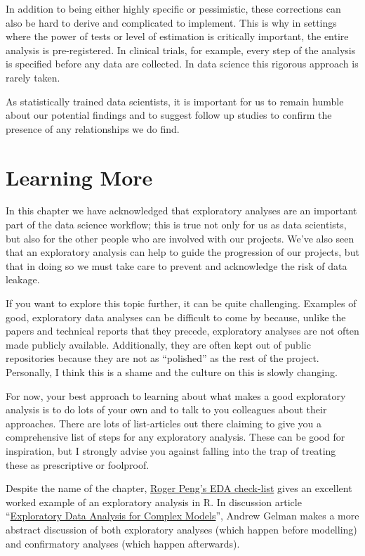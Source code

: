 \documentclass[
  letterpaper,
  DIV=11,
  numbers=noendperiod]{scrreprt}
\begin{document}
In addition to being either highly specific or pessimistic, these
corrections can also be hard to derive and complicated to implement.
This is why in settings where the power of tests or level of estimation
is critically important, the entire analysis is pre-registered. In
clinical trials, for example, every step of the analysis is specified
before any data are collected. In data science this rigorous approach is
rarely taken.

As statistically trained data scientists, it is important for us to
remain humble about our potential findings and to suggest follow up
studies to confirm the presence of any relationships we do find.

\section{Learning More}\label{learning-more}

In this chapter we have acknowledged that exploratory analyses are an
important part of the data science workflow; this is true not only for
us as data scientists, but also for the other people who are involved
with our projects. We've also seen that an exploratory analysis can help
to guide the progression of our projects, but that in doing so we must
take care to prevent and acknowledge the risk of data leakage.

If you want to explore this topic further, it can be quite challenging.
Examples of good, exploratory data analyses can be difficult to come by
because, unlike the papers and technical reports that they precede,
exploratory analyses are not often made publicly available.
Additionally, they are often kept out of public repositories because
they are not as ``polished'' as the rest of the project. Personally, I
think this is a shame and the culture on this is slowly changing.

For now, your best approach to learning about what makes a good
exploratory analysis is to do lots of your own and to talk to you
colleagues about their approaches. There are lots of list-articles out
there claiming to give you a comprehensive list of steps for any
exploratory analysis. These can be good for inspiration, but I strongly
advise you against falling into the trap of treating these as
prescriptive or foolproof.

Despite the name of the chapter,
\href{https://bookdown.org/rdpeng/exdata/exploratory-data-analysis-checklist.html\#follow-up-questions}{Roger
Peng's EDA check-list} gives an excellent worked example of an
exploratory analysis in R. In discussion article
``\href{http://www.stat.columbia.edu/~gelman/research/published/p755.pdf}{Exploratory
Data Analysis for Complex Models}'', Andrew Gelman makes a more abstract
discussion of both exploratory analyses (which happen before modelling)
and confirmatory analyses (which happen afterwards).
\end{document}
